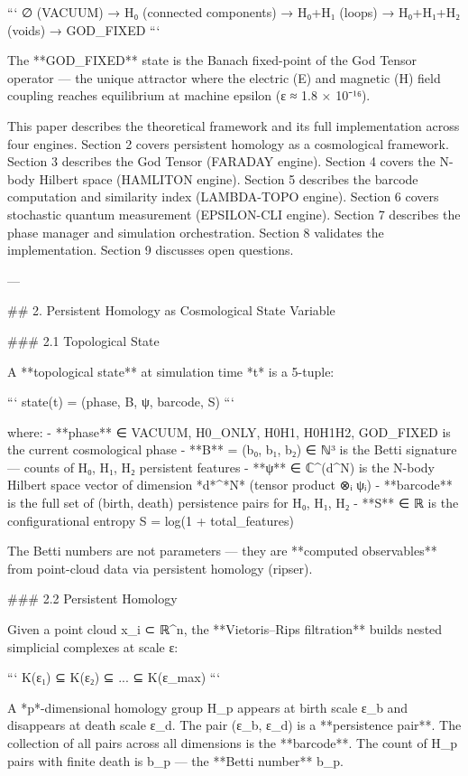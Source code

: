 ```
∅ (VACUUM) → H₀ (connected components) → H₀+H₁ (loops) → H₀+H₁+H₂ (voids) → GOD_FIXED
```

The **GOD_FIXED** state is the Banach fixed-point of the God Tensor operator — the unique attractor where the electric (E) and magnetic (H) field coupling reaches equilibrium at machine epsilon (ε ≈ 1.8 × 10⁻¹⁶).

This paper describes the theoretical framework and its full implementation across four engines.  Section 2 covers persistent homology as a cosmological framework.  Section 3 describes the God Tensor (FARADAY engine).  Section 4 covers the N-body Hilbert space (HAMLITON engine).  Section 5 describes the barcode computation and similarity index (LAMBDA-TOPO engine).  Section 6 covers stochastic quantum measurement (EPSILON-CLI engine).  Section 7 describes the phase manager and simulation orchestration.  Section 8 validates the implementation.  Section 9 discusses open questions.

---

## 2. Persistent Homology as Cosmological State Variable

### 2.1 Topological State

A **topological state** at simulation time *t* is a 5-tuple:

```
state(t) = (phase, B, ψ, barcode, S)
```

where:
- **phase** ∈ {VACUUM, H0_ONLY, H0H1, H0H1H2, GOD_FIXED} is the current cosmological phase
- **B** = (b₀, b₁, b₂) ∈ ℕ³ is the Betti signature — counts of H₀, H₁, H₂ persistent features
- **ψ** ∈ ℂ^(d^N) is the N-body Hilbert space vector of dimension *d*^*N* (tensor product ⊗ᵢ ψᵢ)
- **barcode** is the full set of (birth, death) persistence pairs for H₀, H₁, H₂
- **S** ∈ ℝ is the configurational entropy S = log(1 + total_features)

The Betti numbers are not parameters — they are **computed observables** from point-cloud data via persistent homology (ripser).

### 2.2 Persistent Homology

Given a point cloud {x_i} ⊂ ℝ^n, the **Vietoris–Rips filtration** builds nested simplicial complexes at scale ε:

```
K(ε₁) ⊆ K(ε₂) ⊆ ... ⊆ K(ε_max)
```

A *p*-dimensional homology group H_p appears at birth scale ε_b and disappears at death scale ε_d.  The pair (ε_b, ε_d) is a **persistence pair**.  The collection of all pairs across all dimensions is the **barcode**.  The count of H_p pairs with finite death is b_p — the **Betti number** b_p.

